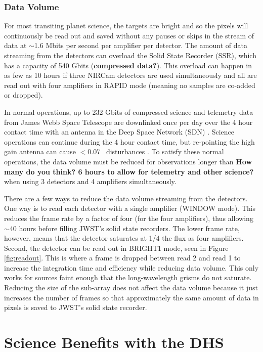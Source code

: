 \documentclass[iop]{emulateapj}
\begin{document}
\subsubsection{Data Volume}
For most transiting planet science, the targets are bright and so the pixels will continuously be read out and saved without any pauses or skips in the stream of data at $\sim$1.6 Mbits per second per amplifier per detector.
The amount of data streaming from the detectors can overload the Solid State Recorder (SSR), which has a capacity of 540 Gbits \citep{johns2008L2comm} (\textbf{compressed data?}).
This overload can happen in as few as 10 hours if three NIRCam detectors are used simultaneously and all are read out with four amplifiers in RAPID mode (meaning no samples are co-added or dropped).

In normal operations, up to 232 Gbits of compressed science and telemetry data from James Webb Space Telescope are downlinked once per day over the 4 hour contact time with an antenna in the Deep Space Network (SDN)  \citep{dashevsky2008groundflight}.
Science operations can continue during the 4 hour contact time, but re-pointing the high gain antenna can cause $<$0.07 \arcsec\ disturbances \citep{beichman2014pasp}.
To satisfy these normal operations, the data volume must be reduced for observations longer than \textbf{How many do you think? 6 hours to allow for telemetry and other science?} when using 3 detectors and 4 amplifiers simultaneously.

There are a few ways to reduce the data volume streaming from the detectors.
One way is to read each detector with a single amplifier (WINDOW mode).
This reduces the frame rate by a factor of four (for the four amplifiers), thus allowing $\sim$40 hours before filling JWST's solid state recorders.
The lower frame rate, however, means that the detector saturates at 1/4 the flux as four amplifiers.
Second, the detector can be read out in BRIGHT1 mode, seen in Figure \ref{fig:readout}.
This is where a frame is dropped between read 2 and read 1 to increase the integration time and efficiency while reducing data volume.
This only works for sources faint enough that the long-wavelength grisms do not saturate.
Reducing the size of the sub-array does not affect the data volume because it just increases the number of frames so that approximately the same amount of data in pixels is saved to JWST's solid state recorder.

\section{Science Benefits with the DHS}\label{sec:addedScience}
\end{document}
